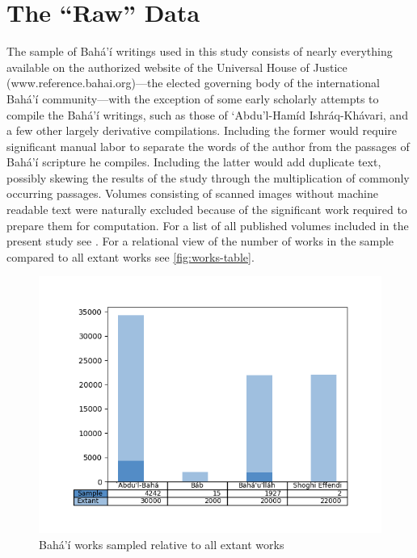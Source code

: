 \documentclass[12pt, oneside]{report}
\begin{document}
\section{The ``Raw'' Data}
\par
The sample of Bah\'{a}'\'{i} writings used in this study consists of nearly everything available on the authorized website of the Universal House of Justice (www.reference.bahai.org)---the elected governing body of the international Bah\'{a}'\'{i} community---with the exception of some early scholarly attempts to compile the Bah\'{a}'\'{i} writings, such as those of `Abdu'l-Ham\'{i}d Ishr\'{a}q-Kh\'{a}vari, and a few other largely derivative compilations.
Including the former would require significant manual labor to separate the words of the author from the passages of Bah\'{a}'\'{i} scripture he compiles.
Including the latter would add duplicate text, possibly skewing the results of the study through the multiplication of commonly occurring passages.
Volumes consisting of scanned images without machine readable text were naturally excluded because of the significant work required to prepare them for computation.
For a list of all published volumes included in the present study see .
For a relational view of the number of works in the sample compared to all extant works see \autoref{fig:works-table}.
\begin{figure}[htb]
\centering
\includegraphics[width=15cm]{figures/works-table.png}
\caption[Bah\'{a}'\'{i} works sampled relative to all extant works]{Bah\'{a}'\'{i} works sampled relative to all extant works}
\label{fig:works-table}
\end{figure}
\end{document}
